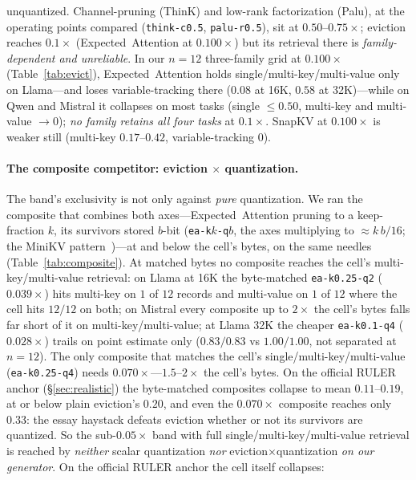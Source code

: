 \documentclass[11pt]{article}
\begin{document}
unquantized. Channel-pruning (ThinK) and low-rank factorization (Palu), at the
operating points compared (\texttt{think-c0.5}, \texttt{palu-r0.5}), sit at
$0.50$--$0.75\times$; eviction reaches $0.1\times$
(Expected~Attention at $0.100\times$) but its retrieval there is
\emph{family-dependent and unreliable}. In our $n{=}12$ three-family grid at
$0.100\times$ (Table~\ref{tab:evict}), Expected~Attention holds
single/multi-key/multi-value only on Llama---and loses variable-tracking there
($0.08$ at 16K, $0.58$ at 32K)---while on Qwen and Mistral it collapses on most
tasks (single $\le0.50$, multi-key and multi-value $\to0$); \emph{no family
retains all four tasks} at $0.1\times$. SnapKV at $0.100\times$ is weaker still
(multi-key $0.17$--$0.42$, variable-tracking $0$).

\paragraph{The composite competitor: eviction $\times$ quantization.} The band's
exclusivity is not only against \emph{pure} quantization. We ran the composite that
combines both axes---Expected~Attention pruning to a keep-fraction $k$, its survivors
stored $b$-bit (\texttt{ea-k$k$-q$b$}, the axes multiplying to $\approx k\,b/16$; the
MiniKV pattern~\citep{sharma2024minikv})---at and below the cell's bytes, on the same needles
(Table~\ref{tab:composite}). At matched bytes no composite reaches the cell's
multi-key/multi-value retrieval: on Llama at 16K the byte-matched
\texttt{ea-k0.25-q2} ($0.039\times$) hits multi-key on $1$ of $12$ records and
multi-value on $1$ of $12$ where the cell hits $12/12$ on both; on Mistral every
composite up to $2\times$ the cell's bytes falls far short of it on
multi-key/multi-value; at Llama 32K the cheaper \texttt{ea-k0.1-q4} ($0.028\times$)
trails on point estimate only ($0.83/0.83$ vs $1.00/1.00$, not separated at
$n{=}12$). The only composite that matches the cell's single/multi-key/multi-value
(\texttt{ea-k0.25-q4}) needs $0.070\times$---$1.5$--$2\times$ the cell's bytes. On
the official RULER anchor (\S\ref{sec:realistic}) the byte-matched composites
collapse to mean $0.11$--$0.19$, at or below plain eviction's $0.20$, and even the
$0.070\times$ composite reaches only $0.33$: the essay haystack defeats eviction
whether or not its survivors are quantized. So the
sub-$0.05\times$ band with full single/multi-key/multi-value retrieval is reached by
\emph{neither} scalar quantization \emph{nor} eviction$\times$quantization
\emph{on our generator}. On the official RULER anchor the cell itself collapses:
\end{document}
